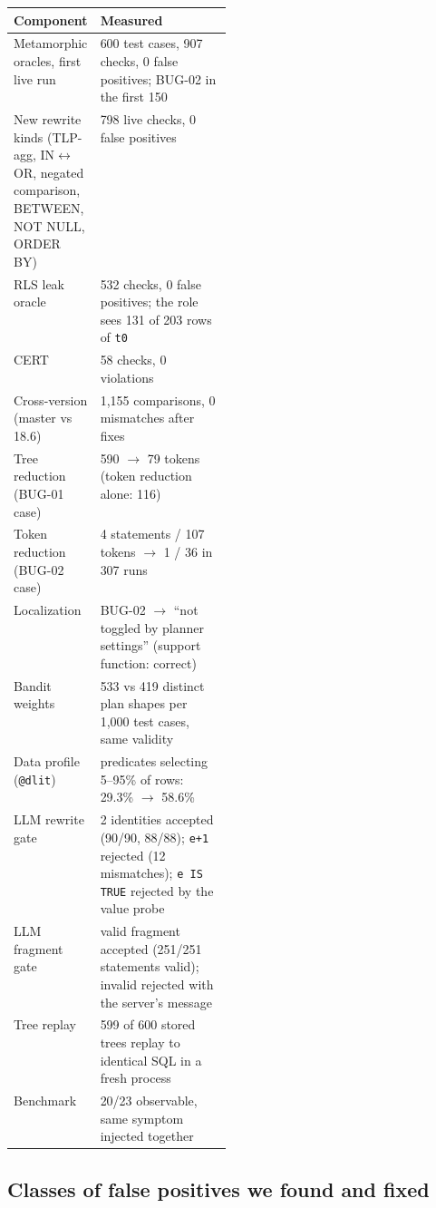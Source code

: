 \begin{center}
\small
\begin{tabularx}{\linewidth}{p{0.28\linewidth}X}
\toprule
Component & Measured \\
\midrule
Metamorphic oracles, first live run & 600 test cases, 907 checks, 0 false positives; BUG-02 in the first 150 \\
New rewrite kinds (TLP-agg, IN$\leftrightarrow$OR, negated comparison, BETWEEN, NOT NULL, ORDER BY) & 798 live checks, 0 false positives \\
RLS leak oracle & 532 checks, 0 false positives; the role sees 131 of 203 rows of \texttt{t0} \\
CERT & 58 checks, 0 violations \\
Cross-version (master vs 18.6) & 1{,}155 comparisons, 0 mismatches after fixes \\
Tree reduction (BUG-01 case) & 590 $\rightarrow$ 79 tokens (token reduction alone: 116) \\
Token reduction (BUG-02 case) & 4 statements / 107 tokens $\rightarrow$ 1 / 36 in 307 runs \\
Localization & BUG-02 $\rightarrow$ ``not toggled by planner settings'' (support function: correct) \\
Bandit weights & 533 vs 419 distinct plan shapes per 1{,}000 test cases, same validity \\
Data profile (\texttt{@dlit}) & predicates selecting 5--95\% of rows: 29.3\% $\rightarrow$ 58.6\% \\
LLM rewrite gate & 2 identities accepted (90/90, 88/88); \texttt{e+1} rejected (12 mismatches); \texttt{e IS TRUE} rejected by the value probe \\
LLM fragment gate & valid fragment accepted (251/251 statements valid); invalid rejected with the server's message \\
Tree replay & 599 of 600 stored trees replay to identical SQL in a fresh process \\
Benchmark & 20/23 observable, same symptom injected together \\
\bottomrule
\end{tabularx}
\end{center}

\subsection{Classes of false positives we found and fixed}
\label{sec:fpclasses}


